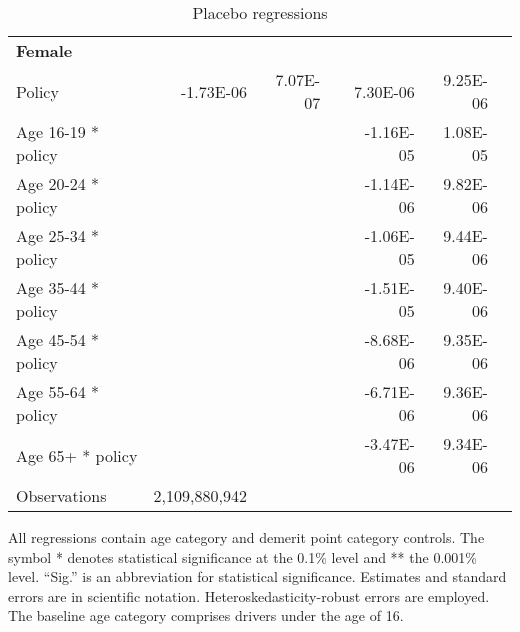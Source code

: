 \begin{table}
\begin{tabular}{l r r l r r l}
\hline 

\textbf{Female} \\ 

Policy             &  -1.73E-06        &  7.07E-07       &            &  7.30E-06        &  9.25E-06       &            \\ 
Age 16-19 * policy           & & &  &  -1.16E-05        &  1.08E-05       &            \\ 
Age 20-24 * policy           & & &  &  -1.14E-06        &  9.82E-06       &            \\ 
Age 25-34 * policy           & & &  &  -1.06E-05        &  9.44E-06       &            \\ 
Age 35-44 * policy           & & &  &  -1.51E-05        &  9.40E-06       &            \\ 
Age 45-54 * policy           & & &  &  -8.68E-06        &  9.35E-06       &            \\ 
Age 55-64 * policy           & & &  &  -6.71E-06        &  9.36E-06       &            \\ 
Age 65+ * policy           & & &  &  -3.47E-06        &  9.34E-06       &            \\ 
Observations & 2,109,880,942  \\ 


\hline 

\end{tabular} 
\caption{Placebo regressions} 
All regressions contain age category and demerit point category controls. 
The symbol * denotes statistical significance at the 0.1\% level 
and ** the 0.001\% level. 
``Sig.'' is an abbreviation for statistical significance. 
Estimates and standard errors are in scientific notation. 
Heteroskedasticity-robust errors are employed. 
The baseline age category comprises drivers under the age of 16. 
\label{tab:orig_placebo_regs} 
\end{table} 
 
